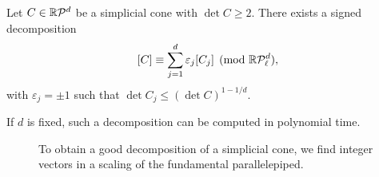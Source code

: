\begin{lemma}
  \label{lemma:signed-decomposition-determinants}
  Let $C \in \mathbb{R}\mathcal{P}^d$ be a simplicial cone with $\det C \geq 2$.
  There exists a signed decomposition
  \[
    [C] \equiv \sum_{j=1}^d \varepsilon_j [C_j] \pmod{\mathbb{R}\mathcal{P}_\ell^d},
  \]
  with $\varepsilon_j = \pm1$ such that $\det C_j \leq (\det C)^{1-1/d}$.

  If $d$ is fixed, such a decomposition can be computed in polynomial time.
\end{lemma}
\begin{figure}
  \begin{center}
  \end{center}
  \caption{To obtain a good decomposition of a simplicial cone,
    we find integer vectors in a scaling of the fundamental parallelepiped.}
  \label{fig:signed-decomposition-determinants}
\end{figure}

